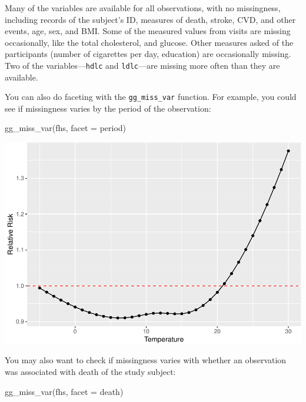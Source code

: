 \documentclass[
]{book}
\newenvironment{Shaded}{\begin{snugshade}}{\end{snugshade}}
\newcommand{\AttributeTok}[1]{\textcolor[rgb]{0.77,0.63,0.00}{#1}}
\newcommand{\FunctionTok}[1]{\textcolor[rgb]{0.00,0.00,0.00}{#1}}
\newcommand{\NormalTok}[1]{#1}
\begin{document}
Many of the variables are available for all observations, with no missingness,
including records of the subject's ID, measures of death, stroke, CVD, and other
events, age, sex, and BMI. Some of the measured values from visits are missing
occasionally, like the total cholesterol, and glucose. Other measures asked of
the participants (number of cigarettes per day, education) are occasionally
missing. Two of the variables---\texttt{hdlc} and \texttt{ldlc}---are missing more often than
they are available.

You can also do faceting with the \texttt{gg\_miss\_var} function. For
example, you could see if missingness varies by the period of the observation:

\begin{Shaded}
\begin{Highlighting}[]
\FunctionTok{gg\_miss\_var}\NormalTok{(fhs, }\AttributeTok{facet =}\NormalTok{ period)}
\end{Highlighting}
\end{Shaded}

\includegraphics{adv_epi_analysis_files/figure-latex/unnamed-chunk-73-1.pdf}

You may also want to check if missingness varies with whether an observation
was associated with death of the study subject:

\begin{Shaded}
\begin{Highlighting}[]
\FunctionTok{gg\_miss\_var}\NormalTok{(fhs, }\AttributeTok{facet =}\NormalTok{ death)}
\end{Highlighting}
\end{Shaded}
\end{document}
